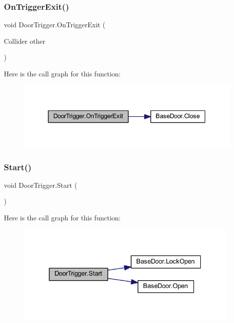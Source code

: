 \subsubsection{\texorpdfstring{On\+Trigger\+Exit()}{OnTriggerExit()}}
{\footnotesize\ttfamily void Door\+Trigger.\+On\+Trigger\+Exit (\begin{DoxyParamCaption}\item[{Collider}]{other }\end{DoxyParamCaption})\hspace{0.3cm}{\ttfamily [private]}}

Here is the call graph for this function\+:\nopagebreak
\begin{figure}[H]
\begin{center}
\leavevmode
\includegraphics[width=331pt]{class_door_trigger_adee54426b691466c5d667b912816bb56_cgraph}
\end{center}
\end{figure}
\mbox{\label{class_door_trigger_a3b079888a26feb3139b6a0507b89c65c}} 
\subsubsection{\texorpdfstring{Start()}{Start()}}
{\footnotesize\ttfamily void Door\+Trigger.\+Start (\begin{DoxyParamCaption}{ }\end{DoxyParamCaption})\hspace{0.3cm}{\ttfamily [private]}}

Here is the call graph for this function\+:\nopagebreak
\begin{figure}[H]
\begin{center}
\leavevmode
\includegraphics[width=313pt]{class_door_trigger_a3b079888a26feb3139b6a0507b89c65c_cgraph}
\end{center}
\end{figure}


